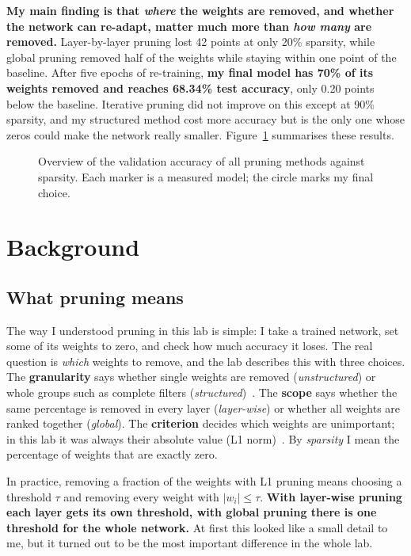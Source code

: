 \documentclass[11pt,a4paper]{article}
\begin{document}
\textbf{My main finding is that \emph{where} the weights are removed, and whether the network can re-adapt, matter much more than \emph{how many} are removed.} Layer-by-layer pruning lost 42 points at only 20\% sparsity, while global pruning removed half of the weights while staying within one point of the baseline. After five epochs of re-training, \textbf{my final model has 70\% of its weights removed and reaches 68.34\% test accuracy}, only 0.20 points below the baseline. Iterative pruning did not improve on this except at 90\% sparsity, and my structured method cost more accuracy but is the only one whose zeros could make the network really smaller. Figure~\ref{fig:overview} summarises these results.

\begin{figure}[H]
\centering

\caption{Overview of the validation accuracy of all pruning methods against sparsity. Each marker is a measured model; the circle marks my final choice.}
\label{fig:overview}
\end{figure}

\section{Background}

\subsection{What pruning means}
The way I understood pruning in this lab is simple: I take a trained network, set some of its weights to zero, and check how much accuracy it loses. The real question is \emph{which} weights to remove, and the lab describes this with three choices. The \textbf{granularity} says whether single weights are removed (\emph{unstructured}) or whole groups such as complete filters (\emph{structured})~\cite{li2017pruning}. The \textbf{scope} says whether the same percentage is removed in every layer (\emph{layer-wise}) or whether all weights are ranked together (\emph{global}). The \textbf{criterion} decides which weights are unimportant; in this lab it was always their absolute value (L1 norm)~\cite{han2015learning}. By \emph{sparsity} I mean the percentage of weights that are exactly zero.

In practice, removing a fraction of the weights with L1 pruning means choosing a threshold $\tau$ and removing every weight with $|w_i| \le \tau$. \textbf{With layer-wise pruning each layer gets its own threshold, with global pruning there is one threshold for the whole network.} At first this looked like a small detail to me, but it turned out to be the most important difference in the whole lab.
\end{document}
